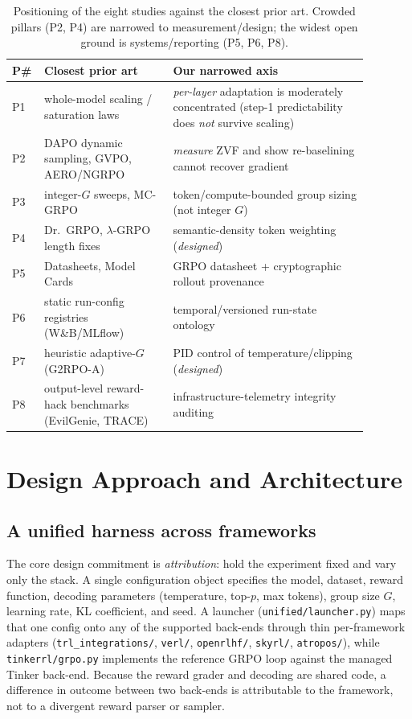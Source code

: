 \documentclass[12pt,a4paper]{report}
\begin{document}
\begin{table}[t]
\centering
\small
\setlength{\tabcolsep}{4pt}
\begin{tabular}{@{}L{0.045\linewidth}L{0.33\linewidth}L{0.50\linewidth}@{}}
\toprule
\textbf{P\#} & \textbf{Closest prior art} & \textbf{Our narrowed axis} \\
\midrule
P1 & whole-model scaling / saturation laws & \emph{per-layer} adaptation is moderately concentrated (step-1 predictability does \emph{not} survive scaling) \\
P2 & DAPO dynamic sampling, GVPO, AERO/NGRPO & \emph{measure} ZVF and show re-baselining cannot recover gradient \\
P3 & integer-$G$ sweeps, MC-GRPO & token/compute-bounded group sizing (not integer $G$) \\
P4 & Dr.\ GRPO, $\lambda$-GRPO length fixes & semantic-density token weighting (\emph{designed}) \\
P5 & Datasheets, Model Cards & GRPO datasheet + cryptographic rollout provenance \\
P6 & static run-config registries (W\&B/MLflow) & temporal/versioned run-state ontology \\
P7 & heuristic adaptive-$G$ (G2RPO-A) & PID control of temperature/clipping (\emph{designed}) \\
P8 & output-level reward-hack benchmarks (EvilGenie, TRACE) & infrastructure-telemetry integrity auditing \\
\bottomrule
\end{tabular}
\caption{Positioning of the eight studies against the closest prior art. Crowded
pillars (P2, P4) are narrowed to measurement/design; the widest open ground is
systems/reporting (P5, P6, P8).}
\label{tab:position}
\end{table}

\section{Design Approach and Architecture}
\label{sec:design}

\subsection{A unified harness across frameworks}

The core design commitment is \emph{attribution}: hold the experiment fixed and
vary only the stack. A single configuration object specifies the model, dataset,
reward function, decoding parameters (temperature, top-$p$, max tokens), group
size $G$, learning rate, KL coefficient, and seed. A launcher
(\texttt{unified/launcher.py}) maps that one config onto any of the supported
back-ends through thin per-framework adapters
(\texttt{trl\_integrations/}, \texttt{verl/}, \texttt{openrlhf/},
\texttt{skyrl/}, \texttt{atropos/}), while \texttt{tinkerrl/grpo.py} implements
the reference GRPO loop against the managed Tinker back-end. Because the reward
grader and decoding are shared code, a difference in outcome between two
back-ends is attributable to the framework, not to a divergent reward parser or
sampler.
\end{document}
